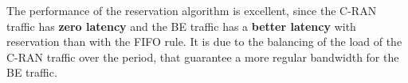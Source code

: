 \documentclass[]{llncs}
\begin{document}
  The performance of the reservation algorithm is excellent, since the C-RAN traffic has {\bf zero latency} and the BE traffic has a \textbf{better latency} with reservation than with the FIFO rule. It is due to the balancing of the load of the C-RAN traffic over the period, that guarantee a more regular bandwidth for the BE traffic.
  

  
  

\end{document}
